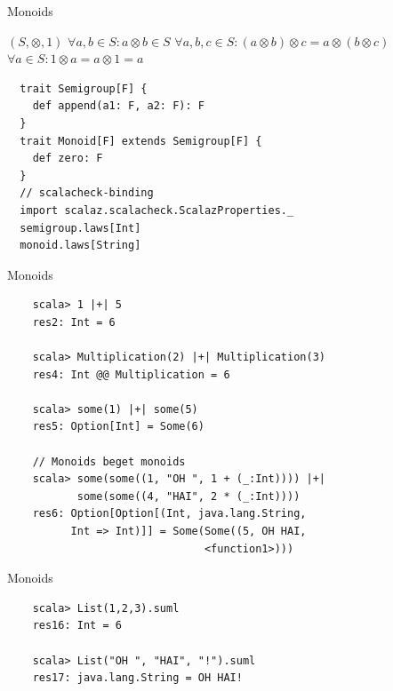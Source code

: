 \documentclass{beamer}
\begin{document}
\begin{frame}[fragile]{Monoids}
\begin{center}
$(S, \otimes, 1)$\newline
$\forall a, b \in S: a \otimes b \in S$\newline
$\forall a, b, c \in S: (a \otimes b) \otimes c = a \otimes (b \otimes c)$\newline
$\forall a \in S: 1 \otimes a = a \otimes 1 = a$\newline
\end{center}
  \begin{verbatim}
  trait Semigroup[F] {
    def append(a1: F, a2: F): F
  }
  trait Monoid[F] extends Semigroup[F] {
    def zero: F
  }
  // scalacheck-binding
  import scalaz.scalacheck.ScalazProperties._
  semigroup.laws[Int]
  monoid.laws[String]
  \end{verbatim}
\end{frame}

\begin{frame}[fragile]{Monoids}
  \begin{verbatim}
    scala> 1 |+| 5
    res2: Int = 6

    scala> Multiplication(2) |+| Multiplication(3)
    res4: Int @@ Multiplication = 6

    scala> some(1) |+| some(5)
    res5: Option[Int] = Some(6)

    // Monoids beget monoids
    scala> some(some((1, "OH ", 1 + (_:Int)))) |+|
           some(some((4, "HAI", 2 * (_:Int))))
    res6: Option[Option[(Int, java.lang.String,
          Int => Int)]] = Some(Some((5, OH HAI,
                               <function1>)))
  \end{verbatim}
\end{frame}

\begin{frame}[fragile]{Monoids}
  \begin{verbatim}
    scala> List(1,2,3).suml
    res16: Int = 6

    scala> List("OH ", "HAI", "!").suml
    res17: java.lang.String = OH HAI!
  \end{verbatim}
\end{frame}
\end{document}
